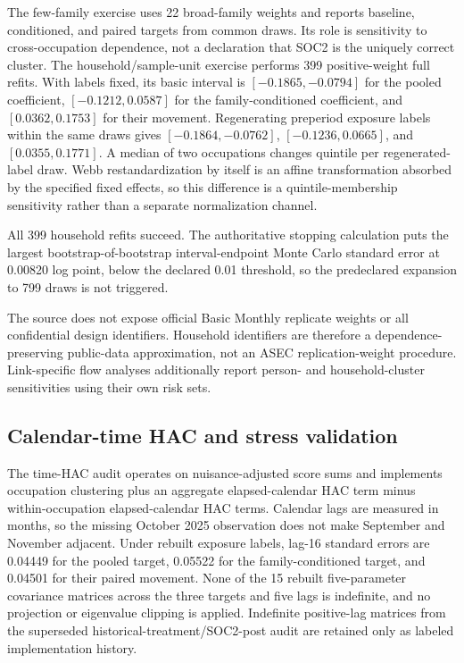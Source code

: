 The few-family exercise uses 22 broad-family weights and reports baseline, conditioned, and paired targets from common draws.  Its role is sensitivity to cross-occupation dependence, not a declaration that SOC2 is the uniquely correct cluster.  The household/sample-unit exercise performs 399 positive-weight full refits.  With labels fixed, its basic interval is $[-0.1865,-0.0794]$ for the pooled coefficient, $[-0.1212,0.0587]$ for the family-conditioned coefficient, and $[0.0362,0.1753]$ for their movement.  Regenerating preperiod exposure labels within the same draws gives $[-0.1864,-0.0762]$, $[-0.1236,0.0665]$, and $[0.0355,0.1771]$.  A median of two occupations changes quintile per regenerated-label draw.  Webb restandardization by itself is an affine transformation absorbed by the specified fixed effects, so this difference is a quintile-membership sensitivity rather than a separate normalization channel.

All 399 household refits succeed.  The authoritative stopping calculation
puts the largest bootstrap-of-bootstrap interval-endpoint Monte Carlo standard
error at 0.00820 log point, below the declared 0.01 threshold, so the
predeclared expansion to 799 draws is not triggered.

The source does not expose official Basic Monthly replicate weights or all confidential design identifiers.  Household identifiers are therefore a dependence-preserving public-data approximation, not an ASEC replication-weight procedure.  Link-specific flow analyses additionally report person- and household-cluster sensitivities using their own risk sets.

\subsection{Calendar-time HAC and stress validation}

The time-HAC audit operates on nuisance-adjusted score sums and implements occupation clustering plus an aggregate elapsed-calendar HAC term minus within-occupation elapsed-calendar HAC terms.  Calendar lags are measured in months, so the missing October 2025 observation does not make September and November adjacent.  Under rebuilt exposure labels, lag-16 standard errors are 0.04449 for the pooled target, 0.05522 for the family-conditioned target, and 0.04501 for their paired movement.  None of the 15 rebuilt five-parameter covariance matrices across the three targets and five lags is indefinite, and no projection or eigenvalue clipping is applied.  Indefinite positive-lag matrices from the superseded historical-treatment/SOC2-post audit are retained only as labeled implementation history.

